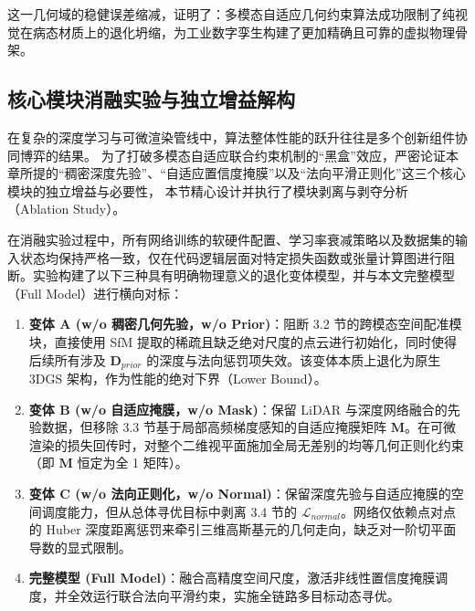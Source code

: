 这一几何域的稳健误差缩减，证明了：多模态自适应几何约束算法成功限制了纯视觉在病态材质上的退化坍缩，为工业数字孪生构建了更加精确且可靠的虚拟物理骨架。



\subsection{核心模块消融实验与独立增益解构}
\label{ch3_subsec:ablation_study}

在复杂的深度学习与可微渲染管线中，算法整体性能的跃升往往是多个创新组件协同博弈的结果。
为了打破多模态自适应联合约束机制的“黑盒”效应，严密论证本章所提的“稠密深度先验”、“自适应置信度掩膜”以及“法向平滑正则化”这三个核心模块的独立增益与必要性，
本节精心设计并执行了模块剥离与剥夺分析（Ablation Study）。

在消融实验过程中，所有网络训练的软硬件配置、学习率衰减策略以及数据集的输入状态均保持严格一致，仅在代码逻辑层面对特定损失函数或张量计算图进行阻断。实验构建了以下三种具有明确物理意义的退化变体模型，并与本文完整模型（Full Model）进行横向对标：

\begin{enumerate}
    \item \textbf{变体 A (w/o 稠密几何先验，w/o Prior)}：阻断 3.2 节的跨模态空间配准模块，直接使用 SfM 提取的稀疏且缺乏绝对尺度的点云进行初始化，同时使得后续所有涉及 $\bm{D}_{prior}$ 的深度与法向惩罚项失效。该变体本质上退化为原生 3DGS 架构，作为性能的绝对下界（Lower Bound）。
    \item \textbf{变体 B (w/o 自适应掩膜，w/o Mask)}：保留 LiDAR 与深度网络融合的先验数据，但移除 3.3 节基于局部高频梯度感知的自适应掩膜矩阵 $\bm{M}$。在可微渲染的损失回传时，对整个二维视平面施加全局无差别的均等几何正则化约束（即 $\bm{M}$ 恒定为全 1 矩阵）。
    \item \textbf{变体 C (w/o 法向正则化，w/o Normal)}：保留深度先验与自适应掩膜的空间调度能力，但从总体寻优目标中剥离 3.4 节的 $\mathcal{L}_{normal}$。网络仅依赖点对点的 Huber 深度距离惩罚来牵引三维高斯基元的几何走向，缺乏对一阶切平面导数的显式限制。
    \item \textbf{完整模型 (Full Model)}：融合高精度空间尺度，激活非线性置信度掩膜调度，并全效运行联合法向平滑约束，实施全链路多目标动态寻优。
\end{enumerate}

